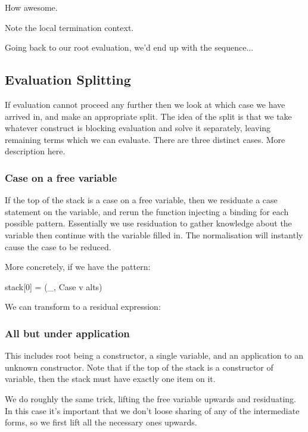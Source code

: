 \documentclass{sigplanconf}
\begin{document}
How awesome.

Note the local termination context.

Going back to our root evaluation, we'd end up with the sequence...

\subsection{Evaluation Splitting}
\label{sec:eval_split}

If evaluation cannot proceed any further then we look at which case we have arrived in, and make an appropriate split. The idea of the split is that we take whatever construct is blocking evaluation and solve it separately, leaving remaining terms which we can evaluate. There are three distinct cases. More description here.

\subsubsection{Case on a free variable}

If the top of the stack is a case on a free variable, then we residuate a case statement on the variable, and rerun the function injecting a binding for each possible pattern. Essentially we use residuation to gather knowledge about the variable then continue with the variable filled in. The normalisation will instantly cause the case to be reduced.

More concretely, if we have the pattern:

\begin{code}
stack[0] = (_, Case v alts)
\end{code}

We can transform to a residual expression:



\subsubsection{All but under application}

This includes root being a constructor, a single variable, and an application to an unknown constructor. Note that if the top of the stack is a constructor of variable, then the stack must have exactly one item on it.

We do roughly the same trick, lifting the free variable upwards and residuating. In this case it's important that we don't loose sharing of any of the intermediate forms, so we first lift all the necessary ones upwards.
\end{document}
